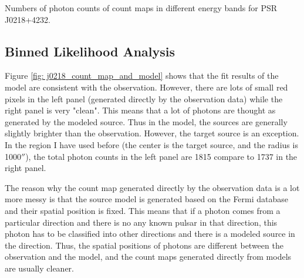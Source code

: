 \documentclass[12pt]{report}
\newcommand{\mycaption}[1]{\protect \caption{#1}}
\begin{document}
          \begin{table}[!htp]   
            \centering
            \mycaption{Numbers of photon counts of count maps in different energy bands for 
                  PSR J0218+4232.}
            \label{table:j0218_ccube_photon_counts}
          \end{table}
          \subsection{Binned Likelihood Analysis}
            Figure \ref{fig: j0218_count_map_and_model} shows that the fit results of the model 
            are consistent with the observation. However, there are lots of small red pixels 
            in the left panel (generated directly by the observation data) while the 
            right panel is very "clean". This means that a lot of photons are thought as 
            generated by the modeled source. Thus in the model, the sources are generally 
            slightly brighter than the observation. However, the target
            source is an exception. In the region I have used before (the center is the 
            target source, and the radius is 1000$''$), the total photon counts in the left 
            panel are 1815 compare to 1737 in the right panel. 

            The reason why the count map generated directly by the observation data is a lot 
            more messy is that the source model is generated based on the Fermi database 
            and their spatial position is fixed. This means that if 
            a photon comes from a particular direction and there is no any known pulsar in 
            that direction, this photon has to be classified into other directions and there 
            is a modeled source in the direction.  Thus, the spatial positions of photons are 
            different between the observation and the model, and the count maps generated 
            directly from models are usually cleaner. 
            
\end{document}
